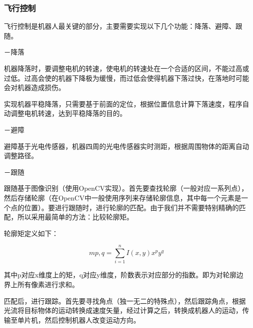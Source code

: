 \documentclass{ctexart}
\begin{document}
\subsubsection{飞行控制}
飞行控制是机器人最关键的部分，主要需要实现以下几个功能：降落、避障、跟随。\par
－降落\par
	机器降落时，要调整电机的转速，使电机的转速处在一个合适的区间，不能过高或过低。过高会使的机器下降极为缓慢，而过低会使得机器下落过快，在落地时可能会对机器造成损伤。\par
	实现机器平稳降落，只需要基于前面的定位，根据位置信息计算下落速度，程序自动调整电机转速，达到平稳降落的目的。\par
－避障\par
	避障基于光电传感器，机器四周的光电传感器实时测距，根据周围物体的距离自动调整路径。\par
－跟随\par
	跟随基于图像识别（使用OpenCV实现）。首先要查找轮廓（一般对应一系列点），然后存储轮廓（在OpenCV中一般使用序列来存储轮廓信息，其中每一个元素是一个点的位置）。要进行跟随时，进行轮廓的匹配。由于我们并不需要特别精确的匹配，所以采用最简单的方法：比较轮廓矩。\par
	轮廓矩定义如下：\par
\[mp,q = \sum\limits_{i = 1}^n {I(x,y){x^p}{y^q}} \]\par
	其中p对应x维度上的矩，q对应y维度，阶数表示对应部分的指数。即为对轮廓边界上所有像素进行求和。\par
	匹配后，进行跟踪。首先要寻找角点（独一无二的特殊点），然后跟踪角点，根据光流将目标物体的运动转换成速度矢量，经过计算之后，转换成机器人的运动，传输至单片机，然后控制机器人改变运动方向。\par
\end{document}
